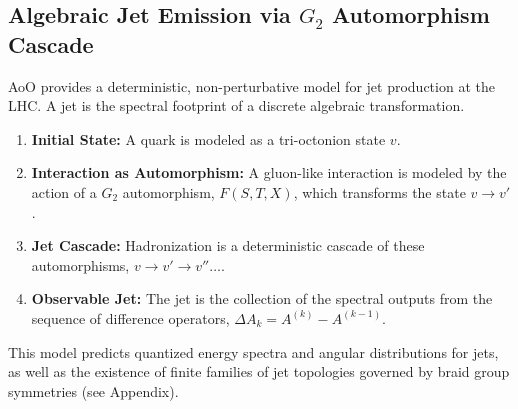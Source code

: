 \documentclass[11pt, a4paper]{article}
\theoremstyle{definition}
\theoremstyle{remark}
\begin{document}
\subsection{Algebraic Jet Emission via $G_2$ Automorphism Cascade}
AoO provides a deterministic, non-perturbative model for jet production at the LHC. A jet is the spectral footprint of a discrete algebraic transformation.

\begin{enumerate}
    \item \textbf{Initial State:} A quark is modeled as a tri-octonion state $v$.
    \item \textbf{Interaction as Automorphism:} A gluon-like interaction is modeled by the action of a $G_2$ automorphism, $F(S,T,X)$, which transforms the state $v \to v'$.
    \item \textbf{Jet Cascade:} Hadronization is a deterministic cascade of these automorphisms, $v \to v' \to v'' \dots$.
    \item \textbf{Observable Jet:} The jet is the collection of the spectral outputs from the sequence of difference operators, $\Delta A_k = A^{(k)} - A^{(k-1)}$.
\end{enumerate}
This model predicts quantized energy spectra and angular distributions for jets, as well as the existence of finite families of jet topologies governed by braid group symmetries (see Appendix).
%
%
%
\end{document}
